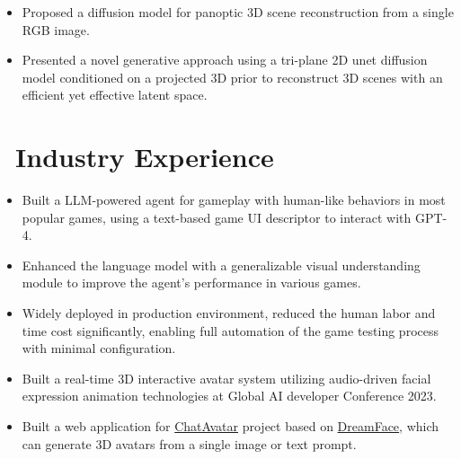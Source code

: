 \documentclass{resume}
\begin{document}

\begin{itemize}
  \item Proposed a diffusion model for panoptic 3D scene reconstruction from a single RGB image.
  \item Presented a novel generative approach using a tri-plane 2D unet diffusion model conditioned on a projected 3D prior to reconstruct 3D scenes with an efficient yet effective latent space.
\end{itemize}

\section{\faUsers\ Industry Experience}


\begin{itemize}
  \item Built a LLM-powered agent for gameplay with human-like behaviors in most popular games, using a text-based game UI descriptor to interact with GPT-4.
  \item Enhanced the language model with a generalizable visual understanding module to improve the agent's performance in various games.
  \item Widely deployed in production environment, reduced the human labor and time cost significantly, enabling full automation of the game testing process with minimal configuration.
\end{itemize}
\vspace{-0.5em}


\begin{itemize}
  \item Built a real-time 3D interactive avatar system utilizing audio-driven facial expression animation technologies at Global AI developer Conference 2023.
  \item Built a web application for \href{https://hyperhuman.deemos.com/}{ChatAvatar} project based on \href{https://dl.acm.org/doi/abs/10.1145/3592094}{DreamFace}, which can generate 3D avatars from a single image or text prompt.
\end{itemize}
\vspace{-0.7em}
\end{document}
